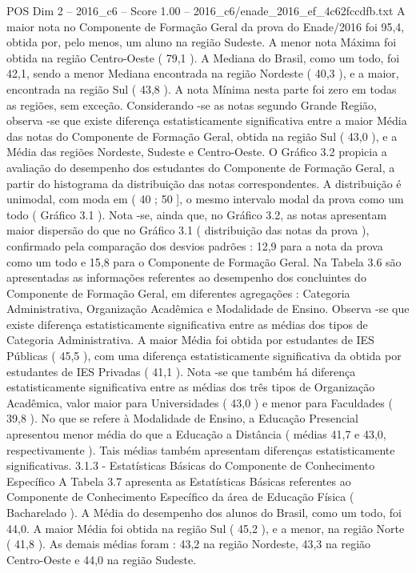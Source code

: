 \begin{textsample}{POS Dim 2 – 2016\_c6 – Score 1.00 – 2016\_c6/enade\_2016\_ef\_4c62fccdfb.txt}
A maior nota no Componente de Formação Geral da prova do Enade/2016 foi 95,4, obtida por, pelo menos, um aluno na região Sudeste.
A menor nota Máxima foi obtida na região Centro-Oeste ( 79,1 ).
A Mediana do Brasil, como um todo, foi 42,1, sendo a menor Mediana encontrada na região Nordeste ( 40,3 ), e a maior, encontrada na região Sul ( 43,8 ).
A nota Mínima nesta parte foi zero em todas as regiões, sem exceção.
Considerando -se as notas segundo Grande Região, observa -se que existe diferença estatisticamente significativa entre a maior Média das notas do Componente de Formação Geral, obtida na região Sul ( 43,0 ), e a Média das regiões Nordeste, Sudeste e Centro-Oeste.
O Gráfico 3.2 propicia a avaliação do desempenho dos estudantes do Componente de Formação Geral, a partir do histograma da distribuição das notas correspondentes.
A distribuição é unimodal, com moda em ( 40 ; 50 ], o mesmo intervalo modal da prova como um todo ( Gráfico 3.1 ).
Nota -se, ainda que, no Gráfico 3.2, as notas apresentam maior dispersão do que no Gráfico 3.1 ( distribuição das notas da prova ), confirmado pela comparação dos desvios padrões : 12,9 para a nota da prova como um todo e 15,8 para o Componente de Formação Geral.
Na Tabela 3.6 são apresentadas as informações referentes ao desempenho dos concluintes do Componente de Formação Geral, em diferentes agregações : Categoria Administrativa, Organização Acadêmica e Modalidade de Ensino.
Observa -se que existe diferença estatisticamente significativa entre as médias dos tipos de Categoria Administrativa.
A maior Média foi obtida por estudantes de IES Públicas ( 45,5 ), com uma diferença estatisticamente significativa da obtida por estudantes de IES Privadas ( 41,1 ).
Nota -se que também há diferença estatisticamente significativa entre as médias dos três tipos de Organização Acadêmica, valor maior para Universidades ( 43,0 ) e menor para Faculdades ( 39,8 ).
No que se refere à Modalidade de Ensino, a Educação Presencial apresentou menor média do que a Educação a Distância ( médias 41,7 e 43,0, respectivamente ).
Tais médias também apresentam diferenças estatisticamente significativas. 3.1.3 - Estatísticas Básicas do Componente de Conhecimento Específico A Tabela 3.7 apresenta as Estatísticas Básicas referentes ao Componente de Conhecimento Específico da área de Educação Física ( Bacharelado ).
A Média do desempenho dos alunos do Brasil, como um todo, foi 44,0.
A maior Média foi obtida na região Sul ( 45,2 ), e a menor, na região Norte ( 41,8 ).
As demais médias foram : 43,2 na região Nordeste, 43,3 na região Centro-Oeste e 44,0 na região Sudeste.

\end{textsample}
